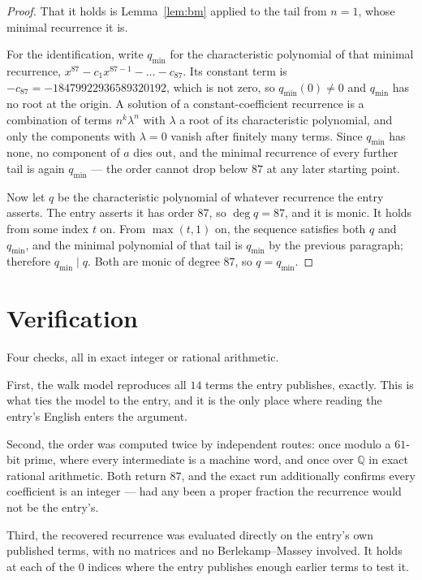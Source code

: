 \documentclass[11pt,a4paper]{article}
\theoremstyle{plain}
\theoremstyle{definition}
\begin{document}
\begin{proof}
That it holds is Lemma~\ref{lem:bm} applied to the tail from $n=1$, whose minimal
recurrence it is.

For the identification, write $q_{\min}$ for the characteristic polynomial of that minimal
recurrence, $x^{87}-c_1x^{87-1}-\dots-c_{87}$. Its constant term is
$-c_{87}=-18479922936589320192$, which is not zero, so $q_{\min}(0)\neq0$ and $q_{\min}$ has no
root at the origin. A solution of a constant-coefficient recurrence is a combination of terms
$n^{k}\lambda^{n}$ with $\lambda$ a root of its characteristic polynomial, and only the
components with $\lambda=0$ vanish after finitely many terms. Since $q_{\min}$ has none, no
component of $a$ dies out, and the minimal recurrence of every further tail is again
$q_{\min}$ --- the order cannot drop below $87$ at any later starting point.

Now let $q$ be the characteristic polynomial of whatever recurrence the entry asserts. The
entry asserts it has order $87$, so $\deg q=87$, and it is monic. It holds from some
index $t$ on. From $\max(t,1)$ on, the sequence satisfies both $q$ and $q_{\min}$, and
the minimal polynomial of that tail is $q_{\min}$ by the previous paragraph; therefore
$q_{\min}\mid q$. Both are monic of degree $87$, so $q=q_{\min}$.
\end{proof}

\section{Verification}

Four checks, all in exact integer or rational arithmetic.

First, the walk model reproduces all $14$ terms the entry publishes, exactly. This is
what ties the model to the entry, and it is the only place where reading the entry's English
enters the argument.

Second, the order was computed twice by independent routes: once modulo a $61$-bit prime, where
every intermediate is a machine word, and once over $\mathbb{Q}$ in exact rational arithmetic.
Both return $87$, and the exact run additionally confirms every coefficient is an integer
--- had any been a proper fraction the recurrence would not be the entry's.

Third, the recovered recurrence was evaluated directly on the entry's own published terms, with
no matrices and no Berlekamp--Massey involved. It holds at each of the $0$ indices where
the entry publishes enough earlier terms to test it.
\end{document}
